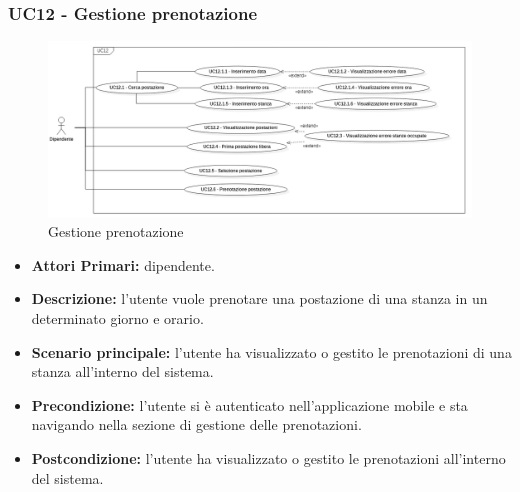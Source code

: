 \subsubsection{ UC12 - Gestione prenotazione }
\begin{figure}[H]
	\centering
	\includegraphics[width=15cm]{res/images/UC12.png}
	\caption{Gestione prenotazione}
	\label{fig:Gestione prenotazione}
\end{figure}
\begin{itemize}
	\item\textbf{Attori Primari:} dipendente.
	\item\textbf{Descrizione:} l’utente vuole prenotare una postazione di una stanza in un determinato giorno e orario.
	\item\textbf{Scenario principale:} l’utente ha visualizzato o gestito le prenotazioni di una stanza all’interno del sistema.
	\item\textbf{Precondizione:} l’utente si è autenticato nell'applicazione mobile e sta navigando nella sezione di gestione delle prenotazioni.
	\item\textbf{Postcondizione:} l’utente ha visualizzato o gestito le prenotazioni all’interno del sistema.
\end{itemize}
